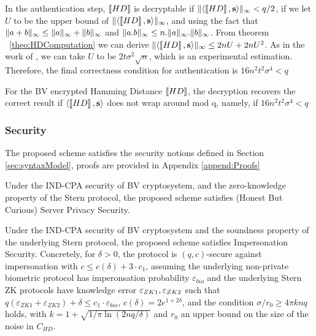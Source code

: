 In the authentication step, \(\left\llbracket HD\right\rrbracket\) is decryptable if \(\Vert \langle \left\llbracket HD\right\rrbracket, \mathbf{s} \rangle \Vert_{\infty} < q/2\), if
we let \(U\) to be the upper bound of \(\Vert \langle \left\llbracket HD\right\rrbracket, \mathbf{s} \rangle \Vert_{\infty}\), and using the fact that
\(\Vert a + b \Vert_{\infty} \leq \Vert a \Vert_{\infty} + \Vert b \Vert_{\infty}\) and \(\Vert a.b \Vert_{\infty} \leq n.\Vert a \Vert_{\infty}.\Vert b \Vert_{\infty}\). From theorem
~\ref{theo:HDComputation} we can derive \(\Vert \langle \left\llbracket HD\right\rrbracket,\mathbf{s} \rangle \Vert_{\infty} \leq 2nU + 2nU^{2}\). As in the
work of \cite{EPRINT:LauNaeVai11}, we can take \(U\) to be \(2t \sigma^{2} \sqrt{n}\), which is an experimental
estimation. Therefore, the final correctness condition for authentication is \( 16n^{2}t^{2}\sigma^{4} < q\)
\begin{lemma}
  \label{le:hdcorrectness}
 For the BV encrypted Hamming Distance \(\left\llbracket HD\right\rrbracket\), the decryption recovers the correct result if \(\langle \left\llbracket HD\right\rrbracket,
 \mathbf{s} \rangle\) does not wrap around mod q, namely, if \(16n^{2}t^{2}\sigma^{4} < q\)
\end{lemma}

\subsubsection{Security}
\label{sec:security}
The proposed scheme satisfies the security notions defined in Section \ref{sec:syntaxModel}, proofs are
provided in Appendix \ref{append:Proofs}
\begin{theorem}
  \label{theo:server}
  Under the IND-CPA security of BV cryptosystem, and the zero-knowledge property of the Stern protocol, the proposed
  scheme satisfies (Honest But Curious) Server Privacy Security.
\end{theorem}
\begin{theorem}
  \label{theo:client}
  Under the IND-CPA security of BV cryptosystem and the soundness property of the underlying Stern protocol, the
  proposed scheme satisfies Impersonation Security. Concretely, for $\delta>0$, the protocol is $(q,c)$-secure against
  impersonation with $c \leq c(\delta) + 3 \cdot c_1$, assuming the underlying non-private biometric protocol has
  imperonsation probability $\varepsilon_{bio}$ and the underlying Stern ZK protocols have knowledge error
  $\varepsilon_{ZK1},\varepsilon_{ZK2}$ such that
  $q(\varepsilon_{ZK1}+\varepsilon_{ZK2}) + \delta \leq c_1 \cdot
  \varepsilon_{bio}$, $c(\delta) = 2 e^{1+2\delta}$, and the condition $\sigma/r_0 \geq 4 \pi k n q$ holds, with
  $k = 1 + \sqrt{1/\pi \ln(2nq/\delta)}$ and $r_0$ an upper bound on the size of the noise in $C_{HD}$.
\end{theorem}

